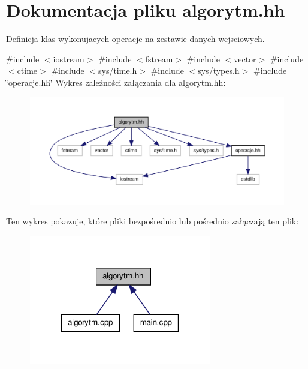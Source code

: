 \hypertarget{algorytm_8hh}{\section{\-Dokumentacja pliku algorytm.\-hh}
\label{algorytm_8hh}
}


\-Definicja klas wykonujacych operacje na zestawie danych wejsciowych.  


{\ttfamily \#include $<$iostream$>$}\*
{\ttfamily \#include $<$fstream$>$}\*
{\ttfamily \#include $<$vector$>$}\*
{\ttfamily \#include $<$ctime$>$}\*
{\ttfamily \#include $<$sys/time.\-h$>$}\*
{\ttfamily \#include $<$sys/types.\-h$>$}\*
{\ttfamily \#include \char`\"{}operacje.\-hh\char`\"{}}\*
\-Wykres zależności załączania dla algorytm.\-hh\-:\nopagebreak
\begin{figure}[H]
\begin{center}
\leavevmode
\includegraphics[width=350pt]{algorytm_8hh__incl}
\end{center}
\end{figure}
\-Ten wykres pokazuje, które pliki bezpośrednio lub pośrednio załączają ten plik\-:\nopagebreak
\begin{figure}[H]
\begin{center}
\leavevmode
\includegraphics[width=226pt]{algorytm_8hh__dep__incl}
\end{center}
\end{figure}
